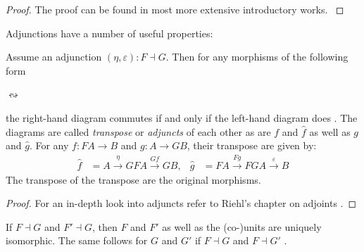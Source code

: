 \documentclass[DIN, pagenumber=false, fontsize=11pt, parskip=half, colorinlistoftodos, svgnames]{scrartcl}
\begin{document}
	\begin{proof}
		The proof can be found in most more extensive introductory works. \cite{brandenburg}
	\end{proof}	
	
	Adjunctions have a number of useful properties:
	
	\begin{lemma}
		\label{lemma: transposed}
		Assume an adjunction $(\eta, \varepsilon): F \dashv G$. Then for any morphisms of the following form 
		\begin{center}
			$\leftrightsquigarrow$
		\end{center}
		
		the right-hand diagram commutes if and only if the left-hand diagram does \cite[Lemma 4.1.3]{riehl_context}. 
		The diagrams are called \emph{transpose} or \emph{adjuncts} of each other as are $f$ and $\hat{f}$ as well as $g$ and $\hat{g}$.
		For any $f: FA \rightarrow B$ and $g: A \rightarrow GB$, their transpose are given by:
		\begin{align*}
			\hat{f} 
			&= A \overset{\eta}{\longrightarrow} GFA \overset{Gf}{\longrightarrow} GB , 
			&
			\hat{g} 
			&= FA \overset{Fg}{\longrightarrow} FGA \overset{\varepsilon}{\longrightarrow} B
		\end{align*}
		The transpose of the transpose are the original morphisms.
	\end{lemma}
	
	\begin{proof}
		For an in-depth look into adjuncts refer to Riehl's chapter on adjoints \cite[Chapter 4]{riehl_context}.
	\end{proof}
	
	\begin{lemma}
		\label{lemma: isoAdjunctions}
		If $F\dashv G$ and $F' \dashv G$, then $F$ and $F'$ as well as the (co-)units are uniquely isomorphic. The same follows for $G$ and $G'$ if $F \dashv G$ and $F \dashv G'$ \cite[Prop. 4.4.1]{riehl_context}.
	\end{lemma}
	
\end{document}
